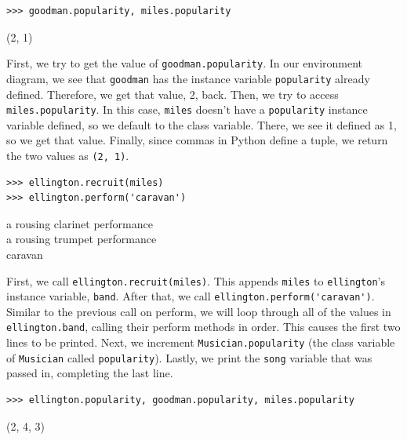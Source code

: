 \begin{blocksection}
\begin{lstlisting}
>>> goodman.popularity, miles.popularity
\end{lstlisting}
\begin{solution}[.2in]
(2, 1)

First, we try to get the value of \lstinline{goodman.popularity}. In our environment diagram, we see that \lstinline{goodman} has the instance variable \lstinline{popularity} already defined. Therefore, we get that value, 2, back. Then, we try to access \lstinline{miles.popularity}. In this case, \lstinline{miles} doesn’t have a \lstinline{popularity} instance variable defined, so we default to the class variable. There, we see it defined as 1, so we get that value. Finally, since commas in Python define a tuple, we return the two values as \lstinline{(2, 1)}.
\end{solution}

\vspace{1\baselineskip}

\begin{lstlisting}
>>> ellington.recruit(miles)
>>> ellington.perform('caravan')
\end{lstlisting}
\begin{solution}[.2in]
a rousing clarinet performance\\
a rousing trumpet performance\\
caravan

First, we call \lstinline{ellington.recruit(miles)}. This appends \lstinline{miles} to \lstinline{ellington}'s instance variable, \lstinline{band}. After that, we call \lstinline{ellington.perform('caravan')}. Similar to the previous call on perform, we will loop through all of the values in \lstinline{ellington.band}, calling their perform methods in order. This causes the first two lines to be printed. Next, we increment \lstinline{Musician.popularity} (the class variable of \lstinline{Musician} called \lstinline{popularity}). Lastly, we print the \lstinline{song} variable that was passed in, completing the last line.
\end{solution}

\vspace{2\baselineskip}

\begin{lstlisting}
>>> ellington.popularity, goodman.popularity, miles.popularity
\end{lstlisting}
\begin{solution}[.2in]
(2, 4, 3)
\end{solution}


\end{blocksection}

